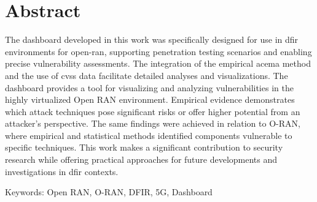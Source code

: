 \chapter*{Abstract}
\label{chap:abstract}
The dashboard developed in this work was specifically designed for use in \gls{dfir} environments for \gls{open-ran}, supporting penetration testing scenarios and enabling precise vulnerability assessments. The integration of the empirical \gls{acema} method and the use of \gls{cvss} data facilitate detailed analyses and visualizations. The dashboard provides a tool for visualizing and analyzing vulnerabilities in the highly virtualized Open RAN environment. Empirical evidence demonstrates which attack techniques pose significant risks or offer higher potential from an attacker{’}s perspective. The same findings were achieved in relation to O-RAN, where empirical and statistical methods identified components vulnerable to specific techniques. This work makes a significant contribution to security research while offering practical approaches for future developments and investigations in \gls{dfir} contexts.
\par Keywords: Open RAN, O-RAN, DFIR, 5G, Dashboard